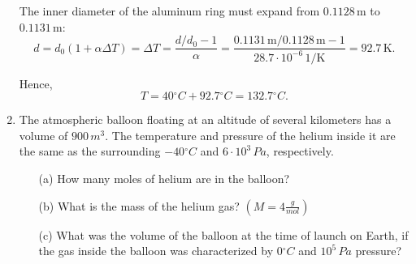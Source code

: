 \documentclass[a4paper,12pt]{letter}
\begin{document}
\begin{enumerate}
\bigskip
  
\begin{center}
\end{center}

The inner diameter of the aluminum ring must expand from $0.1128\,\mathrm{m}$ to $0.1131\,\mathrm{m}$:
$$d=d_0(1+\alpha \Delta T)=\Delta T=\frac{d/d_0-1}{\alpha}=\frac{0.1131\,\mathrm{m}/0.1128\,\mathrm{m}-1}{28.7\cdot 10^{-6}\,\mathrm{1/K}}=92.7\,\mathrm{K}.$$

Hence,
$$T=40{}^{\circ}C+92.7{}^{\circ}C=\boxed{132.7{}^{\circ}C.}$$



\pagebreak
\item The atmospheric balloon floating at an altitude of several kilometers has a volume of $900\,m^{3}$. The temperature and pressure of the helium inside it are the same as the surrounding $-40{}^{\circ}C$ and $6 \cdot 10^{3}\,Pa$, respectively.
\begin{enumerate}
\item[(a)] How many moles of helium are in the balloon?
\item[(b)] What is the mass of the helium gas? $\left(M = 4 \frac{g}{mol}\right)$
\item[(c)] What was the volume of the balloon at the time of launch on Earth, if the gas inside the balloon was characterized by $0{}^{\circ}C$ and $10^{5}\,Pa$ pressure?
\end{enumerate}

\bigskip

\begin{center}
\end{center}



\end{enumerate}
\end{document}
